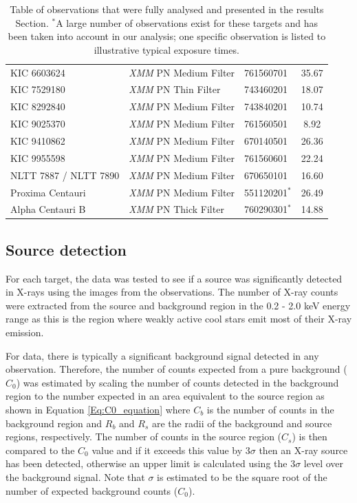 \begin{table}[t]
{\begin{tabular}{lllc}
		KIC 6603624 & \textit{XMM} PN Medium Filter & 761560701 & 35.67 \\
		KIC 7529180  & \textit{XMM} PN Thin Filter & 743460201 & 18.07 \\
		KIC 8292840 & \textit{XMM} PN Medium Filter & 743840201 & 10.74 \\
		KIC 9025370 & \textit{XMM} PN Medium Filter & 761560501 & 8.92 \\
		KIC 9410862 & \textit{XMM} PN Medium Filter & 670140501 & 26.36\\
		KIC 9955598 & \textit{XMM} PN Medium Filter & 761560601 & 22.24 \\
		NLTT 7887 / NLTT 7890 & \textit{XMM} PN Medium Filter & 670650101 & 16.60  \\
		Proxima Centauri & \textit{XMM} PN Medium Filter & 551120201$^*$ & 26.49 \\
		Alpha Centauri B & \textit{XMM} PN Thick Filter & 760290301$^*$ & 14.88 \\     
		\hline
		\end{tabular}}
		\caption[List of X-ray observations used in study]{Table of observations that were fully analysed and presented in the results Section. $^*$A large number of observations exist for these targets and has been taken into account in our analysis; one specific observation is listed to illustrative typical exposure times.}
		\label{table:xray_obs_details}
\end{table}

\subsection{Source detection}
For each target, the data was tested to see if a source was significantly detected in X-rays using the images from the observations. The number of X-ray counts were extracted from the source and background region in the 0.2 - 2.0 keV energy range as this is the region where weakly active cool stars emit most of their X-ray emission.

For \XMM data, there is typically a significant background signal detected in any observation. Therefore, the number of counts expected from a pure background  ($C_{0}$) was estimated by scaling the number of counts detected in the background region to the number expected in an area equivalent to the source region as shown in Equation \ref{Eq:C0_equation} where $C_{b}$ is the number of counts in the background region and $R_{b}$ and $R_{s}$ are the radii of the background and source regions, respectively. The number of counts in the source region ($C_{s}$) is then compared to the $C_{0}$ value and if it exceeds this value by $3\sigma$ then an X-ray source has been detected, otherwise an upper limit is calculated using the $3\sigma$ level over the background signal. Note that $\sigma$ is estimated to be the square root of the number of expected background counts ($C_{0}$). 

